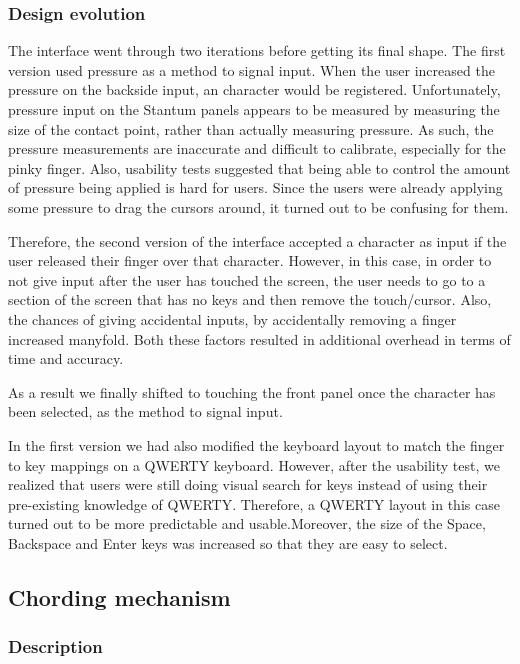\subsubsection{Design evolution}

The interface went through two iterations before getting its final
shape. The first version used pressure as a method to signal
input. When the user increased the pressure on the backside input, an
character would be registered.  Unfortunately, pressure input on the
Stantum panels appears to be measured by measuring the size of the
contact point, rather than actually measuring pressure.  As such, the
pressure measurements are inaccurate and difficult to calibrate,
especially for the pinky finger. Also, usability tests suggested
that being able to control the amount of pressure being applied is
hard for users. Since the users were already applying some pressure to
drag the cursors around, it turned out to be confusing for them.

Therefore, the second version of the interface accepted a character as
input if the user released their finger over that character. However,
in this case, in order to not give input after the user has touched
the screen, the user needs to go to a section of the screen that has
no keys and then remove the touch/cursor. Also, the chances of giving
accidental inputs, by accidentally removing a finger increased
manyfold. Both these factors resulted in additional overhead in terms
of time and accuracy.

As a result we finally shifted to touching the front panel once the
character has been selected, as the method to signal input.

In the first version we had also modified the keyboard layout to match
the finger to key mappings on a QWERTY keyboard. However,
after the usability test, we realized that users were still doing
visual search for keys instead of using their pre-existing knowledge
of QWERTY. Therefore, a QWERTY layout in this case turned out to be
more predictable and usable.Moreover, the size of the Space, Backspace
and Enter keys was increased so that they are easy to select.

\subsection{Chording mechanism}
\subsubsection{Description}

